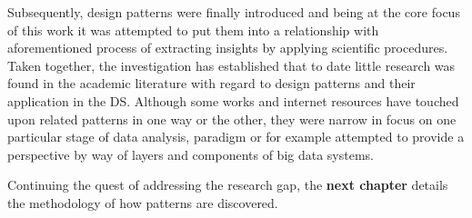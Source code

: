 Subsequently, design patterns were finally introduced and being at the core focus of this work it was attempted to put them into a relationship with aforementioned process of extracting insights by applying scientific procedures.
Taken together, the investigation has established that to date little research was found in the academic literature with regard to design patterns and their application in the \ac{DS}. 
Although some works and internet resources have touched upon related patterns in one way or the other, they were narrow in focus on one particular stage of data analysis, paradigm or for example attempted to provide a perspective by way of layers and components of big data systems.

Continuing the quest of addressing the research gap, the \textbf{next chapter} details the methodology of how patterns are discovered.